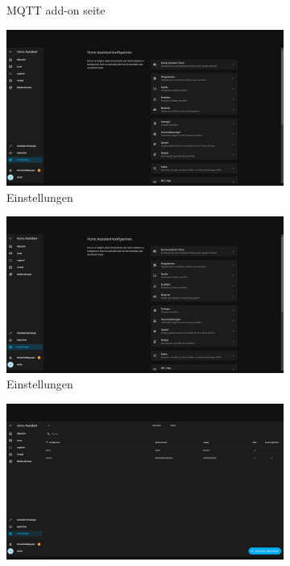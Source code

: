 \begin{figure}[H]
\begin{subfigure}{.5\linewidth}
        \caption{MQTT add-on seite}
        \label{fig:ha7}
    \end{subfigure}
    \begin{subfigure}{.5\linewidth}
        \includegraphics[width=1\textwidth]{img/HA9.png}
        \caption{Einstellungen}
        \label{fig:ha8}
    \end{subfigure}
    \begin{subfigure}{.5\linewidth}
        \includegraphics[width=1\textwidth]{img/HA9.png}
        \caption{Einstellungen}
        \label{fig:ha8}
    \end{subfigure}
    \begin{subfigure}{.5\linewidth}
        \includegraphics[width=1\textwidth]{img/HA10.png}

\end{subfigure}
\end{figure}
